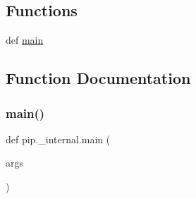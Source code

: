 \subsection*{Functions}
\begin{DoxyCompactItemize}
\item 
def \hyperlink{namespacepip_1_1__internal_af45dd17747a42e9a88101c77858cf019}{main}
\end{DoxyCompactItemize}


\subsection{Function Documentation}
\mbox{\label{namespacepip_1_1__internal_af45dd17747a42e9a88101c77858cf019}} 
\subsubsection{\texorpdfstring{main()}{main()}}
{\footnotesize\ttfamily def pip.\+\_\+internal.\+main (\begin{DoxyParamCaption}\item[{}]{args }\end{DoxyParamCaption})}

